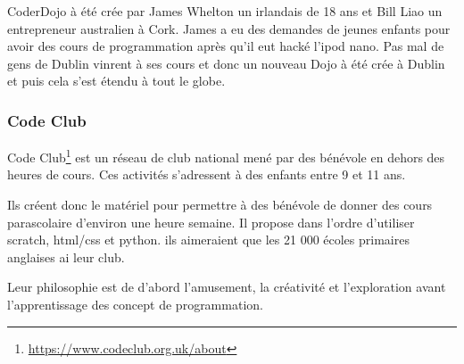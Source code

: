 CoderDojo à été crée par James Whelton un irlandais de 18 ans et Bill Liao un entrepreneur australien à Cork. James a eu des demandes de jeunes enfants pour avoir des cours de programmation après qu'il eut hacké l'ipod nano. Pas mal de gens de Dublin vinrent à ses cours et donc un nouveau Dojo à été crée à Dublin et puis cela s'est étendu à tout le globe.

\subsubsection{Code Club}

Code Club\footnote{\url{https://www.codeclub.org.uk/about}} est un réseau de club national mené par des bénévole en dehors des heures de cours. Ces activités s'adressent à des enfants entre 9 et 11 ans.

Ils créent donc le matériel pour permettre à des bénévole de donner des cours parascolaire d'environ une heure semaine. Il propose dans l'ordre d'utiliser scratch, html/css et python. ils aimeraient que les 21 000 écoles primaires anglaises ai leur club.

Leur philosophie est de d'abord l'amusement, la créativité et l'exploration avant l'apprentissage des concept de programmation.
